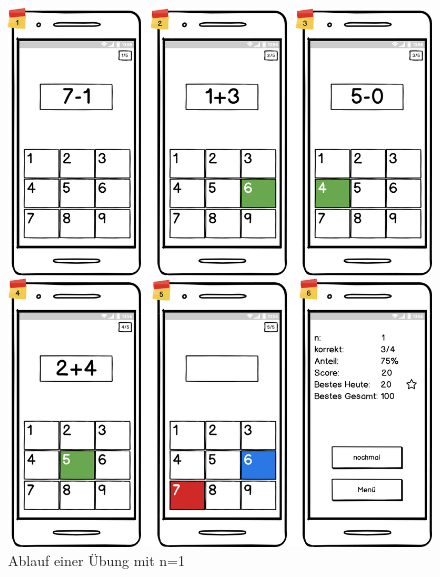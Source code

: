\begin{figure}[htbp]
\centering
\includegraphics[width=1\textwidth]{img/ubungFull.png}
\caption{Ablauf einer Übung mit n=1}
\label{ablauf}
\end{figure}

